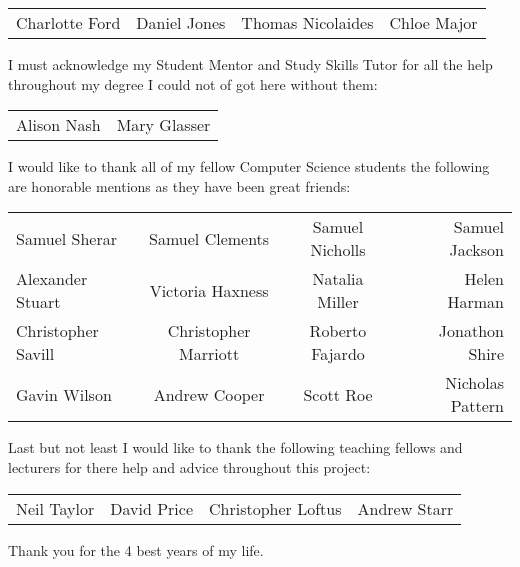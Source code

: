 \begin{center}
\begin{tabular}{ l c c r }
Charlotte Ford & Daniel Jones & Thomas Nicolaides & Chloe Major\\
\end{tabular}

\vspace{4mm}

I must acknowledge my Student Mentor and Study Skills Tutor for all the help throughout my degree I could not of got here without them:

\begin{tabular}{ l r }
Alison Nash & Mary Glasser\\
\end{tabular}

\vspace{4mm}

I would like to thank all of my fellow Computer Science students the following are honorable mentions as they have been great friends: 

\begin{tabular}{ l c c r }
Samuel Sherar & Samuel Clements & Samuel Nicholls & Samuel Jackson \\
Alexander Stuart & Victoria Haxness & Natalia Miller & Helen Harman \\
Christopher Savill & Christopher Marriott & Roberto Fajardo & Jonathon Shire \\
Gavin Wilson & Andrew Cooper & Scott Roe & Nicholas Pattern \\ 
\end{tabular}

\vspace{4mm}

Last but not least I would like to thank the following teaching fellows and lecturers for there help and advice throughout this project:

\begin{tabular}{ l c c r }
Neil Taylor & David Price & Christopher Loftus & Andrew Starr\\
\end{tabular}

\vspace{4mm}

Thank you for the 4 best years of my life.
\end{center}